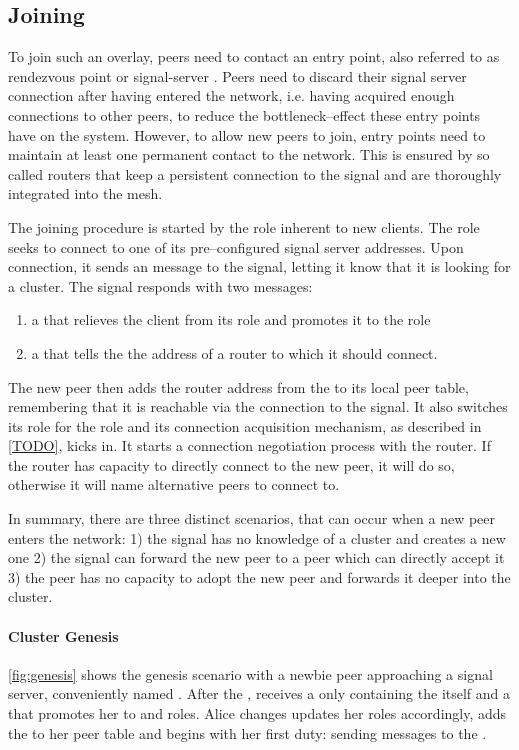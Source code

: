 \subsection{Joining}
To join such an overlay, peers need to contact an entry point, also referred to as rendezvous point or \gls{signal-server} \cite{TODO}.
Peers need to discard their signal server connection after having entered the network, i.e. having acquired enough connections to other peers, to reduce the bottleneck–effect these entry points have on the system.
However, to allow new peers to join, entry points need to maintain at least one permanent contact to the network. This is ensured by so called \glspl{router} that keep a persistent connection to the signal and are thoroughly integrated into the mesh.

The joining procedure is started by the \newbieRole role inherent to new clients. The \newbieRole role seeks to connect to one of its pre–configured signal server addresses.
Upon connection, it sends an \introduction message to the signal, letting it know that it is looking for a cluster. The signal responds with two messages:
\begin{enumerate}
    \item a \roleUpdate that relieves the client from its \newbieRole role and promotes it to the \peerRole role
    \item a \peerUpdate that tells the \newbieRole the address of a \gls{router} to which it should connect.
\end{enumerate}
The new peer then adds the router address from the \peerUpdate to its local peer table, remembering that it is reachable via the connection to the signal.
It also switches its \newbieRole role for the \peerRole role and its connection acquisition mechanism, as described in \ref{TODO}, kicks in. It starts a connection negotiation process with the router. If the router has capacity to directly connect to the new peer, it will do so, otherwise it will name alternative peers to connect to.

In summary, there are three distinct scenarios, that can occur when a new peer enters the network: 1) the signal has no knowledge of a cluster and creates a new one 2) the signal can forward the new peer to a \routerRole peer which can directly accept it 3) the \routerRole peer has no capacity to adopt the new peer and forwards it deeper into the cluster.

\paragraph{Cluster Genesis}
\vref{fig:genesis} shows the genesis scenario with a newbie peer \alice approaching a signal server, conveniently named \signal. After the \introduction, \alice receives a \peerUpdate only containing the \signal itself and a \roleUpdate that promotes her to \peerRole and \routerRole roles. Alice changes updates her roles accordingly, adds the \signal to her peer table and begins with her first \routerRole duty: sending \routerAlive messages to the \signal.

